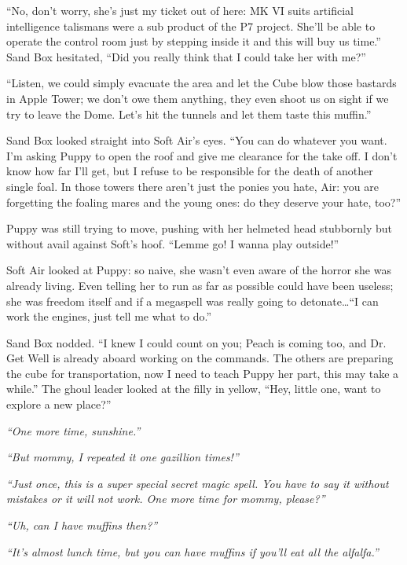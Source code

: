 ``No, don't worry, she's just my ticket out of here: MK VI suits artificial intelligence talismans were a sub product of the P7 project. She'll be able to operate the control room just by stepping inside it and this will buy us time.'' Sand Box hesitated, ``Did you really think that I could take her with me?''

``Listen, we could simply evacuate the area and let the Cube blow those bastards in Apple Tower; we don't owe them anything, they even shoot us on sight if we try to leave the Dome. Let's hit the tunnels and let them taste this muffin.''

Sand Box looked straight into Soft Air's eyes. ``You can do whatever you want. I'm asking Puppy to open the roof and give me clearance for the take off. I don't know how far I'll get, but I refuse to be responsible for the death of another single foal. In those towers there aren't just the ponies you hate, Air: you are forgetting the foaling mares and the young ones: do they deserve your hate, too?''

Puppy was still trying to move, pushing with her helmeted head stubbornly but without avail against Soft's hoof. ``Lemme go! I wanna play outside!''

Soft Air looked at Puppy: so naive, she wasn't even aware of the horror she was already living. Even telling her to run as far as possible could have been useless; she was freedom itself and if a megaspell was really going to detonate\dots ``I can work the engines, just tell me what to do.''

Sand Box nodded. ``I knew I could count on you; Peach is coming too, and Dr. Get Well is already aboard working on the commands. The others are preparing the cube for transportation, now I need to teach Puppy her part, this may take a while.'' The ghoul leader looked at the filly in yellow, ``Hey, little one, want to explore a new place?''

\horizonline


\emph{``One more time, sunshine.''}

\emph{``But mommy, I repeated it one gazillion times!''}

\emph{``Just once, this is a super special secret magic spell. You have to say it without mistakes or it will not work. One more time for mommy, please?''}

\emph{``Uh, can I have muffins then?''}

\emph{``It's almost lunch time, but you can have muffins if you'll eat all the alfalfa.''}

